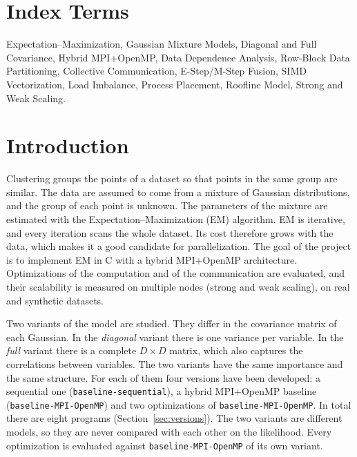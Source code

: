 \documentclass[conference,onecolumn]{IEEEtran}
\newcommand{\vseq}{\texttt{baseline-\allowbreak sequential}}
\newcommand{\vbase}{\texttt{baseline-\allowbreak MPI-\allowbreak OpenMP}}
\begin{document}
\newpage
\section*{Index Terms}
Expectation--Maximization, Gaussian Mixture Models, Diagonal and Full Covariance, Hybrid MPI+OpenMP, Data Dependence Analysis, Row-Block Data Partitioning, Collective Communication, E-Step/M-Step Fusion, SIMD Vectorization, Load Imbalance, Process Placement, Roofline Model, Strong and Weak Scaling.

\setcounter{tocdepth}{3}
\tableofcontents

\pretocmd{\section}{\clearpage}{}{}

\section{Introduction}
Clustering groups the points of a dataset so that points in the same group are similar. The data are assumed to come from a mixture of Gaussian distributions, and the group of each point is unknown. The parameters of the mixture are estimated with the Expectation--Maximization (EM) algorithm. EM is iterative, and every iteration scans the whole dataset. Its cost therefore grows with the data, which makes it a good candidate for parallelization. The goal of the project is to implement EM in C with a hybrid MPI+OpenMP architecture. Optimizations of the computation and of the communication are evaluated, and their scalability is measured on multiple nodes (strong and weak scaling), on real and synthetic datasets.

Two variants of the model are studied. They differ in the covariance matrix of each Gaussian. In the \emph{diagonal} variant there is one variance per variable. In the \emph{full} variant there is a complete $D\times D$ matrix, which also captures the correlations between variables. The two variants have the same importance and the same structure. For each of them four versions have been developed: a sequential one (\vseq{}), a hybrid MPI+OpenMP baseline (\vbase{}) and two optimizations of \vbase{}. In total there are eight programs (Section~\ref{sec:versions}). The two variants are different models, so they are never compared with each other on the likelihood. Every optimization is evaluated against \vbase{} of its own variant.
\end{document}

